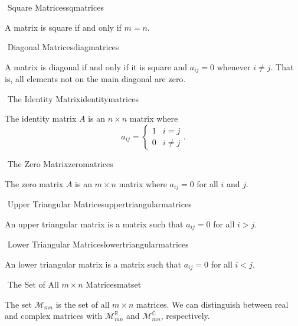         \begin{definition}{\Stop\,\,Square Matrices}{sqmatrices}
        
            A matrix is square if and only if \(m=n\).
        
        \end{definition}
        \begin{definition}{\Stop\,\,Diagonal Matrices}{diagmatrices}
        
            A matrix is diagonal if and only if it is square and \(a_{ij}=0\) whenever \(i\neq j\). That is, all elements not on the main diagonal are zero.
        
        \end{definition}
        \begin{definition}{\Stop\,\,The Identity Matrix}{identitymatrices}
        
            The identity matrix \(A\) is an \(n\times n\) matrix where
            \begin{equation*}
                a_{ij}=\begin{cases} 1 & i=j \\ 0 & i\neq j \end{cases}.
            \end{equation*}
        
        \end{definition}
        \begin{definition}{\Stop\,\,The Zero Matrix}{zeromatrices}
        
            The zero matrix \(A\) is an \(m\times n\) matrix where \(a_{ij}=0\) for all \(i\) and \(j\).
            
        \end{definition}
        \begin{definition}{\Stop\,\,Upper Triangular Matrices}{uppertriangularmatrices}
        
            An upper triangular matrix is a matrix such that \(a_{ij}=0\) for all \(i>j\).
            
        \end{definition}
        \begin{definition}{\Stop\,\,Lower Triangular Matrices}{lowertriangularmatrices}
        
            An lower triangular matrix is a matrix such that \(a_{ij}=0\) for all \(i<j\).
            
        \end{definition}
        \begin{definition}{\Stop\,\,The Set of All \(m\times n\) Matrices}{matset}
        
            The set \(\mathcal{M}_{mn}\) is the set of all \(m\times n\) matrices. We can distinguish between real and complex matrices with \(\mathcal{M}_{mn}^\mathbb{R}\) and \(\mathcal{M}_{mn}^\mathbb{C}\), respectively.
            
        \end{definition}
